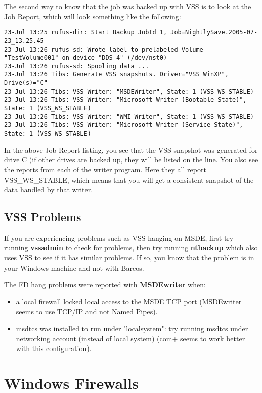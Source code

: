 The second way to know that the job was backed up with VSS is to look at the
Job Report, which will look something like the following:
\footnotesize
\begin{verbatim}
23-Jul 13:25 rufus-dir: Start Backup JobId 1, Job=NightlySave.2005-07-23_13.25.45
23-Jul 13:26 rufus-sd: Wrote label to prelabeled Volume "TestVolume001" on device "DDS-4" (/dev/nst0)
23-Jul 13:26 rufus-sd: Spooling data ...
23-Jul 13:26 Tibs: Generate VSS snapshots. Driver="VSS WinXP", Drive(s)="C"
23-Jul 13:26 Tibs: VSS Writer: "MSDEWriter", State: 1 (VSS_WS_STABLE)
23-Jul 13:26 Tibs: VSS Writer: "Microsoft Writer (Bootable State)", State: 1 (VSS_WS_STABLE)
23-Jul 13:26 Tibs: VSS Writer: "WMI Writer", State: 1 (VSS_WS_STABLE)
23-Jul 13:26 Tibs: VSS Writer: "Microsoft Writer (Service State)", State: 1 (VSS_WS_STABLE)
\end{verbatim}
\normalsize
In the above Job Report listing, you see that the VSS snapshot was generated for drive C (if
other drives are backed up, they will be listed on the  line.
You also see the
reports from each of the writer program.  Here they all report VSS\_WS\_STABLE, which means
that you will get a consistent snapshot of the data handled by that writer.

\subsection{VSS Problems}


If you are experiencing problems such as VSS hanging on MSDE, first try
running {\bf vssadmin} to check for problems, then try running {\bf
ntbackup} which also uses VSS to see if it has similar problems. If so, you
know that the problem is in your Windows machine and not with Bareos.

The FD hang problems were reported with {\bf MSDEwriter} when:
\begin{itemize}
\item a local firewall locked local access to the MSDE TCP port (MSDEwriter
seems to use TCP/IP and not Named Pipes).
\item msdtcs was installed to run under "localsystem": try running msdtcs
under  networking account (instead of local system) (com+ seems to work
better with this configuration).
\end{itemize}


\section{Windows Firewalls}

